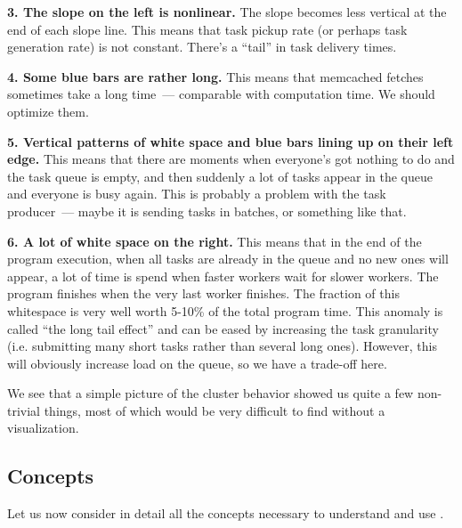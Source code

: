 \documentclass{article}
\begin{document}
\textbf{3. The slope on the left is nonlinear.} The slope becomes less vertical at the end of each slope line. This means that task pickup rate (or perhaps task generation rate) is not constant. There's a ``tail'' in task delivery times. 

\textbf{4. Some blue bars are rather long.} This means that memcached fetches sometimes take a long time~--- comparable with computation time. We should optimize them.

\textbf{5. Vertical patterns of white space and blue bars lining up on their left edge.} This means that there are moments when everyone's got nothing to do and the task queue is empty, and then suddenly a lot of tasks appear in the queue and everyone is busy again. This is probably a problem with the task producer~--- maybe it is sending tasks in batches, or something like that.

\textbf{6. A lot of white space on the right.} This means that in the end of the program execution, when all tasks are already in the queue and no new ones will appear, a lot of time is spend when faster workers wait for slower workers. The program finishes when the very last worker finishes. The fraction of this whitespace is very well worth 5-10\% of the total program time. This anomaly is called ``the long tail effect'' and can be eased by increasing the task granularity (i.e. submitting many short tasks rather than several long ones). However, this will obviously increase load on the queue, so we have a trade-off here.

\vspace{3mm}

We see that a simple picture of the cluster behavior showed us quite a few non-trivial things, most of which would be very difficult to find without a visualization.

\pagebreak
\subsection{Concepts}

Let us now consider in detail all the concepts necessary to understand and use \splot{}.
\end{document}
